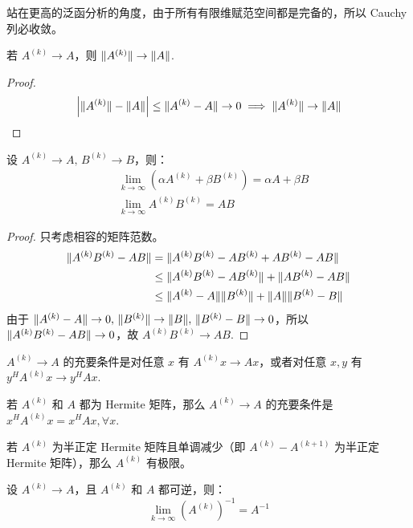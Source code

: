 \begin{remark}
站在更高的泛函分析的角度，由于所有有限维赋范空间都是完备的，所以 Cauchy 列必收敛。
\end{remark}

\begin{property}
若 $A^{(k)}\to A$，则 $\Vert A^{(k)}\Vert\to\Vert A\Vert$.
\end{property}
\begin{proof}
\[
    \left|\Vert A^{(k)}\Vert-\Vert A\Vert\right|\leq\Vert A^{(k)}-A\Vert\to0\implies\Vert A^{(k)}\Vert\to\Vert A\Vert
\]
\end{proof}

\begin{property}
设 $A^{(k)}\to A,\,B^{(k)}\to B$，则：
\begin{align*}
    &\lim_{k\to\infty}\left(\alpha A^{(k)}+\beta B^{(k)}\right)=\alpha A+\beta B\\
    &\lim_{k\to\infty}A^{(k)}B^{(k)}=AB
\end{align*}
\end{property}
\begin{proof}
只考虑相容的矩阵范数。
\begin{align*}
    \Vert A^{(k)}B^{(k)}-AB\Vert&=\Vert A^{(k)}B^{(k)}-AB^{(k)}+AB^{(k)}-AB\Vert\\
    &\leq\Vert A^{(k)}B^{(k)}-AB^{(k)}\Vert+\Vert AB^{(k)}-AB\Vert\\
    &\leq\Vert A^{(k)}-A\Vert\Vert B^{(k)}\Vert+\Vert A\Vert\Vert B^{(k)}-B\Vert
\end{align*}
由于 $\Vert A^{(k)}-A\Vert\to0,\,\Vert B^{(k)}\Vert\to\Vert B\Vert,\,\Vert B^{(k)}-B\Vert\to0$，所以 $\Vert A^{(k)}B^{(k)}-AB\Vert\to0$，故 $A^{(k)}B^{(k)}\to AB$.
\end{proof}

\begin{theorem}
$A^{(k)}\to A$ 的充要条件是对任意 $x$ 有 $A^{(k)}x\to Ax$，或者对任意 $x,y$ 有 $y^HA^{(k)}x\to y^HAx$.
\end{theorem}

\begin{theorem}
若 $A^{(k)}$ 和 $A$ 都为 Hermite 矩阵，那么 $A^{(k)}\to A$ 的充要条件是 $x^HA^{(k)}x=x^HAx,\forall x$.
\end{theorem}

\begin{corollary}[类比单调有界定理]
若 $A^{(k)}$ 为半正定 Hermite 矩阵且单调减少（即 $A^{(k)}-A^{(k+1)}$ 为半正定 Hermite 矩阵），那么 $A^{(k)}$ 有极限。
\end{corollary}

\begin{property}
设 $A^{(k)}\to A$，且 $A^{(k)}$ 和 $A$ 都可逆，则：
\[
    \lim_{k\to\infty}\left(A^{(k)}\right)^{-1}=A^{-1}
\]
\end{property}

